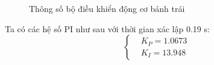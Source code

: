 \begin{itemize}
\begin{figure}[H]
                    \caption{Thông số bộ điều khiển động cơ bánh trái}
                    \label{params_JGB2}
               \end{figure}
               \hspace*{0.6cm}Ta có các hệ số PI như sau với thời gian xác lập 0.19 s:
               \begin{equation*}
                    \begin{cases}
                         &K_P = 1.0673 \\ 
                         &K_I = 13.948
                    \end{cases}
               \end{equation*} 
          \end{itemize}

          

